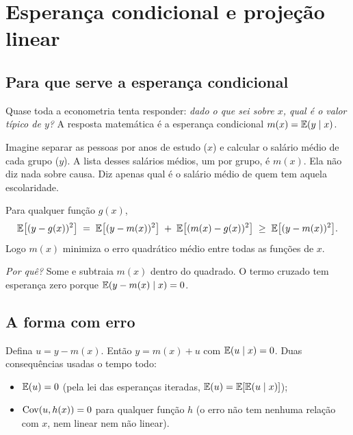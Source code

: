 \chapter{Esperança condicional e projeção linear}
\label{cap:ec}

\section{Para que serve a esperança condicional}
Quase toda a econometria tenta responder: \emph{dado o que sei sobre $x$, qual é o valor típico de $y$?} A resposta matemática é a esperança condicional $m(x)=\mathbb{E}(y\mid x)$.

\begin{intuicao}
Imagine separar as pessoas por anos de estudo ($x$) e calcular o salário médio de cada grupo ($y$). A lista desses salários médios, um por grupo, é $m(x)$. Ela não diz nada sobre causa. Diz apenas qual é o salário médio de quem tem aquela escolaridade.
\end{intuicao}

\begin{resultado}
Para qualquer função $g(x)$,
\[
\mathbb{E}\big[(y-g(x))^2\big] \;=\; \mathbb{E}\big[(y-m(x))^2\big] \;+\; \mathbb{E}\big[(m(x)-g(x))^2\big] \;\ge\; \mathbb{E}\big[(y-m(x))^2\big].
\]
Logo $m(x)$ minimiza o erro quadrático médio entre todas as funções de $x$.
\end{resultado}
\emph{Por quê?} Some e subtraia $m(x)$ dentro do quadrado. O termo cruzado tem esperança zero porque $\mathbb{E}(y-m(x)\mid x)=0$.

\section{A forma com erro}
Defina $u = y - m(x)$. Então $y=m(x)+u$ com $\mathbb{E}(u\mid x)=0$. Duas consequências usadas o tempo todo:
\begin{itemize}[leftmargin=1.4em]
\item $\mathbb{E}(u)=0$ (pela lei das esperanças iteradas, $\mathbb{E}(u)=\mathbb{E}[\mathbb{E}(u\mid x)]$);
\item $\operatorname{Cov}(u,h(x))=0$ para qualquer função $h$ (o erro não tem nenhuma relação com $x$, nem linear nem não linear).
\end{itemize}

